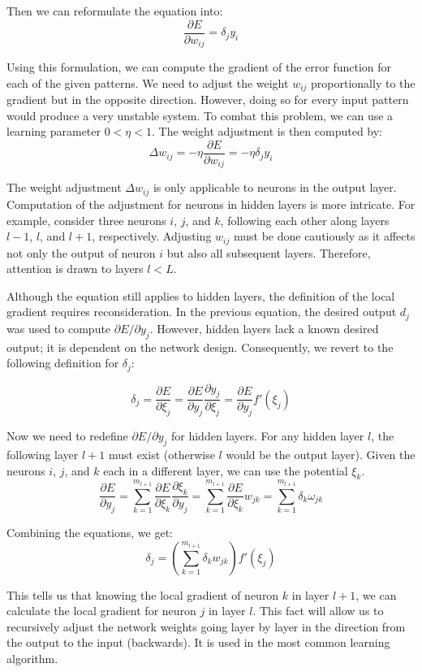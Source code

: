 \documentclass[a4paper]{report}
\begin{document}
{Then we can reformulate the equation into:
\[ \frac{\partial E}{\partial w_{ij}} = \delta_j y_i \]

Using this formulation, we can compute the gradient of the error function for each of the given patterns. We need to adjust the weight \(w_{ij}\) proportionally to the gradient but in the opposite direction. However, doing so for every input pattern would produce a very unstable system. To combat this problem, we can use a learning parameter \(0 < \eta < 1\). The weight adjustment is then computed by:
\[ \Delta w_{ij} = -\eta \frac{\partial E}{\partial w_{ij}} = -\eta \delta_j y_i \]

The weight adjustment $\Delta w_{ij}$ is only applicable to neurons in the output layer. Computation of the adjustment for neurons in hidden layers is more intricate. For example, consider three neurons $i$, $j$, and $k$, following each other along layers $l - 1$, $l$, and $l + 1$, respectively. Adjusting $w_{ij}$ must be done cautiously as it affects not only the output of neuron $i$ but also all subsequent layers. Therefore, attention is drawn to layers $l < L$.

Although the equation still applies to hidden layers, the definition of the local gradient requires reconsideration. In the previous equation, the desired output $d_j$ was used to compute $\partial E / \partial y_j$. However, hidden layers lack a known desired output; it is dependent on the network design. Consequently, we revert to the following definition for $\delta_j$:

\[ \delta_j = \frac{\partial E}{\partial \xi_j} = \frac{\partial E}{\partial y_j} \frac{\partial y_j}{\partial \xi_j} = \frac{\partial E}{\partial y_j} f'(\xi_j) \]

Now we need to redefine \(\partial E / \partial y_j\) for hidden layers. For any hidden layer \(l\), the following layer \(l + 1\) must exist (otherwise \(l\) would be the output layer). Given the neurons \(i\), \(j\), and \(k\) each in a different layer, we can use the potential \(\xi_k\).
\[ \frac{\partial E}{\partial y_j} = \sum_{k=1}^{m_{l+1}} \frac{\partial E}{\partial \xi_k} \frac{\partial \xi_k}{\partial y_j} = \sum_{k=1}^{m_{l+1}} \frac{\partial E}{\partial \xi_k} w_{jk}=\sum_{k=1}^{m_{l+1}}\delta_k\omega_{jk} \]

Combining the equations, we get:
\[ \delta_j = \left(\sum_{k=1}^{m_{l+1}} \delta_k w_{jk} \right)f'(\xi_j) \]

This tells us that knowing the local gradient of neuron \(k\) in layer \(l + 1\), we can calculate the local gradient for neuron \(j\) in layer \(l\). This fact will allow us to recursively adjust the network weights going layer by layer in the direction from the output to the input (backwards). It is used in the most common learning algorithm.

}
\end{document}

